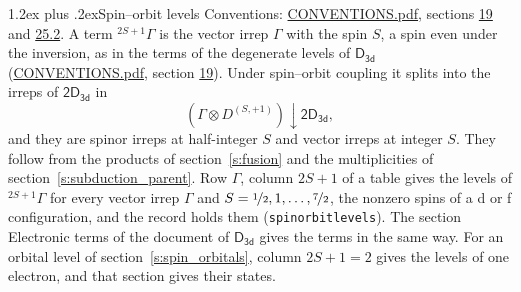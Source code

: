 \documentclass[10pt,a4paper]{article}
\makeatletter
\renewcommand\section{\@startsection{section}{1}{\z@}{-3ex plus -1ex minus -.2ex}%
  {1.2ex plus .2ex}{\normalfont\large\sffamily\bfseries\color{parttitle}}}
\numberwithin{equation}{section}
\newcommand{\grp}[1]{\mathsf{#1}}
\newcommand{\restr}[2]{#1\!\downarrow#2}
\newcommand{\irrJp}[2]{D^{(#1,#2)}}
\newcommand{\irrprod}{\otimes}
\newcommand{\term}[2]{{}^{#1}#2}
\makeatother
\begin{document}
\section{Spin--orbit levels}\label{s:spin_orbit}
Conventions: \href{../../CONVENTIONS.pdf}{CONVENTIONS.pdf}, sections \href{../../../rotation/CONVENTIONS.pdf\#conv.19}{19} and \href{../../CONVENTIONS.pdf\#conv.25.2}{25.2}.
\leavevmode\label{n:local.spin}\label{n:symbol.term}A term $\term{2S+1}{\Gamma}$ is the vector irrep $\Gamma$ with the spin $S$, a spin even under the inversion, as in the terms of the degenerate levels of \href{../../../rotation/data/pdf/D3d.pdf}{$\grp{D_{3d}}$} (\href{../../CONVENTIONS.pdf}{CONVENTIONS.pdf}, section \href{../../../rotation/CONVENTIONS.pdf\#conv.19}{19}). Under spin--orbit coupling it splits into the irreps of $\grp{2D_{3d}}$ in
\begin{equation}\label{e:spinorbit}\restr{(\Gamma \irrprod \irrJp{S}{+1})}{\grp{2D_{3d}}},\end{equation}
and they are spinor irreps at half-integer $S$ and vector irreps at integer $S$. They follow from the products of section~\ref{s:fusion} and the multiplicities of section~\ref{s:subduction_parent}. Row $\Gamma$, column $2S + 1$ of a table gives the levels of $\term{2S+1}{\Gamma}$ for every vector irrep $\Gamma$ and $S = \nicefrac{1}{2}, 1, \dots, \nicefrac{7}{2}$, the nonzero spins of a d or f configuration, and the record holds them (\texttt{spinorbitlevels}). The section Electronic terms of the document of \href{../../../rotation/data/pdf/D3d.pdf}{$\grp{D_{3d}}$} gives the terms in the same way. For an orbital level of section~\ref{s:spin_orbitals}, column $2S + 1 = 2$ gives the levels of one electron, and that section gives their states.
\end{document}
